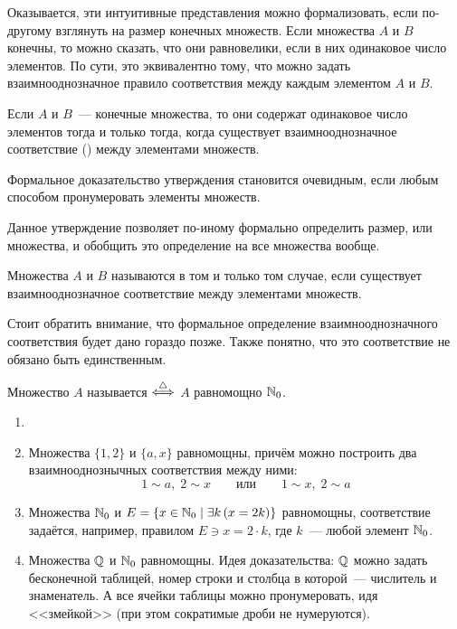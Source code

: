 Оказывается, эти интуитивные представления можно формализовать, если по-другому взглянуть на размер конечных множеств.
Если множества $ A $ и $ B $ конечны, то можно сказать, что они равновелики, если в них одинаковое число элементов.
По сути, это эквивалентно тому, что можно задать взаимнооднозначное правило соответствия между каждым элементом $ A $ и $ B $.

\begin{statement}
    Если $ A $ и $ B $~--- конечные множества, то они содержат одинаковое число элементов тогда и только тогда,
    когда существует взаимнооднозначное соответствие () между элементами множеств.
\end{statement}

Формальное доказательство утверждения становится очевидным, если любым способом пронумеровать элементы множеств.

Данное утверждение позволяет по-иному формально определить размер, или  множества, и обобщить это определение на все множества вообще.
\begin{definition}
    Множества $ A $ и $ B $ называются  в том и только том случае,
    если существует взаимнооднозначное соответствие между элементами множеств.
\end{definition}
Стоит обратить внимание, что формальное определение взаимнооднозначного соответствия будет дано гораздо позже.
Также понятно, что это соответствие не обязано быть единственным.

\begin{definition}
    Множество $ A $ называется  $ \overset{\triangle}{\Longleftrightarrow} $ $ A $ равномощно $ \mathbb{N}_0 $.
\end{definition}

\begin{example}
    \begin{enumerate}
        \item[]
        \item
            Множества $ \{1, 2\} $ и $ \{a, x\} $ равномощны, причём можно построить два взаимнооднознычных соответствия между ними:
            \[
                1 \sim a, \; 2 \sim x \qquad \text{или} \qquad 1 \sim x, \; 2 \sim a
            \]
        \item
            Множества $ \mathbb{N}_0 $ и $ E = \{ x \in \mathbb{N}_0 \mid \exists k \, (x = 2k) \} $ равномощны, соответствие задаётся, например, правилом $ E \ni x = 2 \cdot k $, где $ k $~--- любой элемент $ \mathbb{N}_0 $.
        \item
            Множества $ \mathbb{Q} $ и $ \mathbb{N}_0 $ равномощны.
            Идея доказательства: $ \mathbb{Q} $ можно задать бесконечной таблицей, номер строки и столбца в которой~--- числитель и знаменатель.
            А все ячейки таблицы можно пронумеровать, идя <<змейкой>> (при этом сократимые дроби не нумеруются).
    \end{enumerate}
\end{example}

